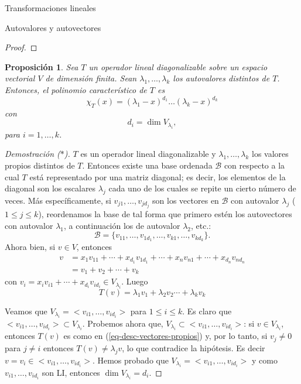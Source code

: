 \documentclass[a4paper,12pt,twoside,spanish,reqno]{amsbook}
\newtheorem{proposicion}[teorema]{Proposici\'on}
\theoremstyle{definition}
\theoremstyle{remark}
\begin{document}
\begin{chapter}{Transformaciones lineales}
\begin{section}{Autovalores y autovectores}
\begin{proof}
        \end{proof}
    
        \begin{proposicion}
             Sea $T$ un operador lineal diagonalizable sobre un espacio vectorial $V$ de dimensión finita. Sean $\lambda_1,\ldots,\lambda_k$ los autovalores distintos de $T$. Entonces,  el  polinomio característico de $T$ es
                 $$
                 \chi_T(x) = (\lambda_1 -x)^{d_1}\ldots(\lambda_k- x)^{d_k}
                 $$
                 con
                 $$
                 d_i =  \dim V_{\lambda_i},
                 $$
                 para  $i=1, \ldots, k$.
        \end{proposicion}
        \begin{proof}[Demostración ($*$)]
            $T$ es un operador lineal diagonalizable y $\lambda_1,\ldots,\lambda_k$ los valores propios distintos de $T$. Entonces existe una base ordenada $\mathcal B$ con respecto a la cual $T$ está representado por una matriz diagonal; es decir, los elementos de la diagonal son los escalares $\lambda_j$ cada uno de los cuales se repite un cierto número de veces. Más específicamente, si
             $v_{j1},\ldots,v_{jd_j}$ son los vectores en $\mathcal{B}$ con autovalor $\lambda_j$ ($1 \le j \le k$),  reordenamos la base de tal forma que primero estén los autovectores con autovalor $\lambda_1$, a continuación los de autovalor $\lambda_2$, etc.: 
            \begin{equation*}
                \mathcal{B} = \{v_{11},\ldots,v_{1d_1},\ldots,v_{k1},\ldots,v_{kd_k}\}. 
            \end{equation*}
            Ahora bien,  si $v \in V$,  entonces 
            \begin{align*}
            v &=x_1v_{11}+\cdots+x_{d_1}v_{1d_1}+\cdots+x_nv_{n1}+\cdots+x_{d_n}v_{nd_n} \\
            &= v_1 + v_2 +\cdots + v_k
            \end{align*}
            con $v_i = x_iv_{i1}+\cdots+x_{d_i}v_{id_i} \in V_{\lambda_i}$. Luego
            \begin{equation}\label{eq-desc-vectores-propios}
                T(v)  =\lambda_1v_1+\lambda_2v_2\cdots+\lambda_kv_k
            \end{equation} 
            
            Veamos que $V_{\lambda_i} = <v_{i1},\ldots,v_{id_i}>$ para $1 \le i \le k$. Es claro que  $<v_{i1},\ldots,v_{id_i}> \subset V_{\lambda_i}$. Probemos  ahora que,  $V_{\lambda_i} \subset <v_{i1},\ldots,v_{id_i}>$: si  $v \in V_{\lambda_i}$,  entonces $T(v)$ es como en (\ref{eq-desc-vectores-propios}) y, por lo tanto, si $v_j \ne 0$ para $j\not=i$ entonces $T(v) \ne \lambda_j v$, lo que contradice la hipótesis. Es decir $v = v_i \in <v_{i1},\ldots,v_{id_i}>$. Hemos probado que    $V_{\lambda_i} = <v_{i1},\ldots,v_{id_i}>$ y como $v_{i1},\ldots,v_{id_i}$ son LI, entonces $\dim V_{\lambda_i} = d_i$.
            

\end{proof}
\end{section}
\end{chapter}
\end{document}
